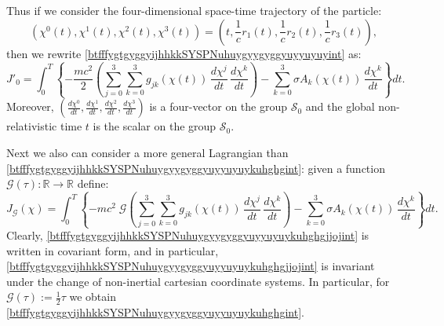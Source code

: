 \documentclass{article}
\theoremstyle{definition}
\theoremstyle{remark}
\newcommand{\er}{\eqref}
\newcommand{\er}{\eqref}
\begin{document}
Thus if we consider the four-dimensional space-time trajectory of
the particle:
\begin{equation}\label{btfffjhgjghghint}
\left(\chi^0(t),\chi^1(t),\chi^2(t),\chi^3(t)\right)=\left(t,\frac{1}{c}r_1(t),\frac{1}{c}r_2(t),\frac{1}{c}r_3(t)\right),
\end{equation}
then we rewrite \er{btfffygtgyggyijhhkkSYSPNuhuygyygyggyuyyuyuyint}
as:
\begin{equation}\label{btfffygtgyggyijhhkkSYSPNuhuygyygyggyuyyuyuykuhghgint}
J'_0=
\int_0^T\left\{-\frac{mc^2}{2}\left(\sum_{j=0}^{3}\sum_{k=0}^{3}g_{jk}\left(\chi(t)\right)\,\frac{d\chi^j}{dt}\,\frac{d\chi^k}{dt}\right)-\sum_{k=0}^{3}\sigma
A_k\left(\chi(t)\right)\,\frac{d\chi^k}{dt}\right\}dt.
\end{equation}
Moreover, $\left(\frac{d\chi^0}{dt}, \frac{d\chi^1}{dt},
\frac{d\chi^2}{dt}, \frac{d\chi^3}{dt}\right)$ is a four-vector on
the group $\mathcal{S}_0$ and the global non-relativistic time $t$
is the scalar on the group $\mathcal{S}_0$.


Next we also can consider a more general Lagrangian than
\er{btfffygtgyggyijhhkkSYSPNuhuygyygyggyuyyuyuykuhghgint}: given a
function $\mathcal{G}(\tau):\mathbb{R}\to\mathbb{R}$ define:
\begin{equation}\label{btfffygtgyggyijhhkkSYSPNuhuygyygyggyuyyuyuykuhghgjjojint}
J_{\mathcal{G}}(\chi)=
\int_0^T\left\{-mc^2\;\mathcal{G}\left(\sum_{j=0}^{3}\sum_{k=0}^{3}g_{jk}\left(\chi(t)\right)\,\frac{d\chi^j}{dt}\,\frac{d\chi^k}{dt}\right)-\sum_{k=0}^{3}\sigma
A_k\left(\chi(t)\right)\,\frac{d\chi^k}{dt}\right\}dt.
\end{equation}
Clearly,
\er{btfffygtgyggyijhhkkSYSPNuhuygyygyggyuyyuyuykuhghgjjojint} is
written in covariant form, and in particular,
\er{btfffygtgyggyijhhkkSYSPNuhuygyygyggyuyyuyuykuhghgjjojint} is
invariant under the change of non-inertial cartesian coordinate
systems. In particular, for $\mathcal{G}(\tau):=\frac{1}{2}\tau$ we
obtain \er{btfffygtgyggyijhhkkSYSPNuhuygyygyggyuyyuyuykuhghgint}.
\end{document}
